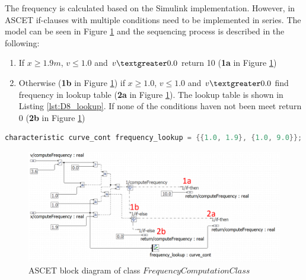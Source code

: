 The frequency is calculated based on the Simulink implementation. However, in ASCET if-clauses with multiple conditions need to be implemented in series. The model can be seen in Figure \ref{fig:BlockdiagrammFrequencyComputationClass} and the sequencing process is described in the following:

\begin{enumerate}
\item If $x \geq 1.9m$, $v \leq 1.0$ and $v \textgreater 0.0$ return 10 (\textbf{1a} in Figure \ref{fig:BlockdiagrammFrequencyComputationClass})
\item Otherwise (\textbf{1b} in Figure \ref{fig:BlockdiagrammFrequencyComputationClass}) if $x \geq 1.0$, $v \leq 1.0$ and $v \textgreater 0.0$ find frequency in lookup table (\textbf{2a} in Figure \ref{fig:BlockdiagrammFrequencyComputationClass}). The lookup table is shown in Listing \ref{lst:D8_lookup}. If none of the conditions haven not been meet return 0 (\textbf{2b} in Figure \ref{fig:BlockdiagrammFrequencyComputationClass})
\end{enumerate}

\begin{lstlisting}[language=Java,basicstyle=\scriptsize, caption= ASCET frequency lookup table,label= lst:D8_lookup]
characteristic curve_cont frequency_lookup = {{1.0, 1.9}, {1.0, 9.0}};
\end{lstlisting}

\begin{figure}[H]
\centering
\includegraphics[width=1\textwidth]{images/Blockdiagramm_FrequencyComputationClassAnno.png}
\caption{ASCET block diagram of class $FrequencyComputationClass$}
\label{fig:BlockdiagrammFrequencyComputationClass}
\end{figure}

